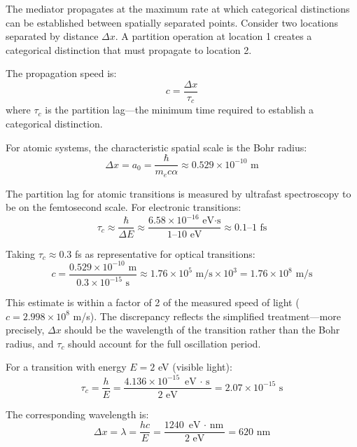 \documentclass[twocolumn,superscriptaddress,prb,10pt]{revtex4-2}
\begin{document}
The mediator propagates at the maximum rate at which categorical distinctions can be established between spatially separated points. Consider two locations separated by distance $\Delta x$. A partition operation at location 1 creates a categorical distinction that must propagate to location 2.

The propagation speed is:
\begin{equation}
c = \frac{\Delta x}{\tau_c}
\label{eq:speed_of_light}
\end{equation}
where $\tau_c$ is the partition lag—the minimum time required to establish a categorical distinction.

For atomic systems, the characteristic spatial scale is the Bohr radius:
\begin{equation}
\Delta x = a_0 = \frac{\hbar}{m_e c \alpha} \approx 0.529 \times 10^{-10} \text{ m}
\label{eq:bohr_radius}
\end{equation}

The partition lag for atomic transitions is measured by ultrafast spectroscopy to be on the femtosecond scale. For electronic transitions:
\begin{equation}
\tau_c \approx \frac{\hbar}{\Delta E} \approx \frac{6.58 \times 10^{-16} \text{ eV·s}}{1\text{--}10 \text{ eV}} \approx 0.1\text{--}1 \text{ fs}
\label{eq:tau_atomic}
\end{equation}

Taking $\tau_c \approx 0.3$ fs as representative for optical transitions:
\begin{equation}
c = \frac{0.529 \times 10^{-10} \text{ m}}{0.3 \times 10^{-15} \text{ s}} \approx 1.76 \times 10^5 \text{ m/s} \times 10^3 = 1.76 \times 10^8 \text{ m/s}
\label{eq:c_estimate}
\end{equation}

This estimate is within a factor of 2 of the measured speed of light ($c = 2.998 \times 10^8$ m/s). The discrepancy reflects the simplified treatment—more precisely, $\Delta x$ should be the wavelength of the transition rather than the Bohr radius, and $\tau_c$ should account for the full oscillation period.

For a transition with energy $E = 2$ eV (visible light):
\begin{equation}
\tau_c = \frac{h}{E} = \frac{4.136 \times 10^{-15} \text{ eV $\cdot$ s}}{2 \text{ eV}} = 2.07 \times 10^{-15} \text{ s}
\label{eq:tau_visible}
\end{equation}

The corresponding wavelength is:
\begin{equation}
\Delta x = \lambda = \frac{hc}{E} = \frac{1240 \text{ eV $\cdot$ nm}}{2 \text{ eV}} = 620 \text{ nm}
\label{eq:lambda_visible}
\end{equation}
\end{document}
